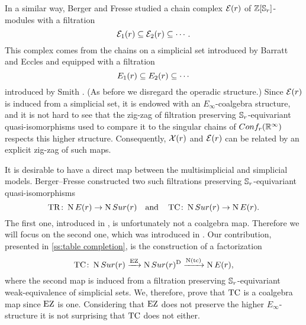 In a similar way, Berger and Fresse \cite{berger2004combinatorial} studied a chain complex $\mathcal{E}(r)$ of $\mathbb{Z}[\mathbb{S}_r]$-modules with a filtration
\[
\mathcal{E}_{1}(r) \subseteq \mathcal{E}_{2}(r) \subseteq \dotsb \,.
\]
This complex comes from the chains on a simplicial set introduced by Barratt and Eccles \cite{barrat1974operad} and equipped with a filtration
\[
E_{1}(r) \subseteq E_{2}(r) \subseteq \dotsb
\]
introduced by Smith \cite{smith1989filtration}.
(As before we disregard the operadic structure.)
Since $\mathcal{E}(r)$ is induced from a simplicial set, it is endowed with an $E_\infty$-coalgebra structure, and it is not hard to see that the zig-zag of filtration preserving $\mathbb{S}_r$-equivariant quasi-isomorphisms used to compare it to the singular chains of $Conf_{r}(\mathbb{R}^{\infty})$ respects this higher structure.
Consequently, $\mathcal{X}(r)$ and $\mathcal{E}(r)$ can be related by an explicit zig-zag of such maps.

It is desirable to have a direct map between the multisimplicial and simplicial models.
Berger--Fresse constructed two such filtrations preserving $\mathbb{S}_r$-equivariant quasi-isomorphisms
\[
\operatorname{TR} \colon \operatorname{N}E(r) \to \operatorname{N}Sur(r)
\quad \text{and} \quad
\operatorname{TC} \colon \operatorname{N}Sur(r) \to \operatorname{N} E(r).
\]
The first one, introduced in \cite[1$\cdot$3]{berger2004combinatorial}, is unfortunately not a coalgebra map.
Therefore we will focus on the second one, which was introduced in \cite{berger2002prismatic}.
Our contribution, presented in \cref{ss:table completion}, is the construction of a factorization
\[
\operatorname{TC} \colon \operatorname{N}Sur(r) \xrightarrow{\operatorname{EZ}} \operatorname{N}Sur(r)^{\mathrm{D}} \xrightarrow{\operatorname{N}(\operatorname{tc})} \operatorname{N} E(r),
\]
where the second map is induced from a filtration preserving $\mathbb{S}_r$-equivariant weak-equivalence of simplicial sets.
We, therefore, prove that $\operatorname{TC}$ is a coalgebra map since $\operatorname{EZ}$ is one.
Considering that $\operatorname{EZ}$ does not preserve the higher $E_\infty$-structure it is not surprising that $\operatorname{TC}$ does not either.